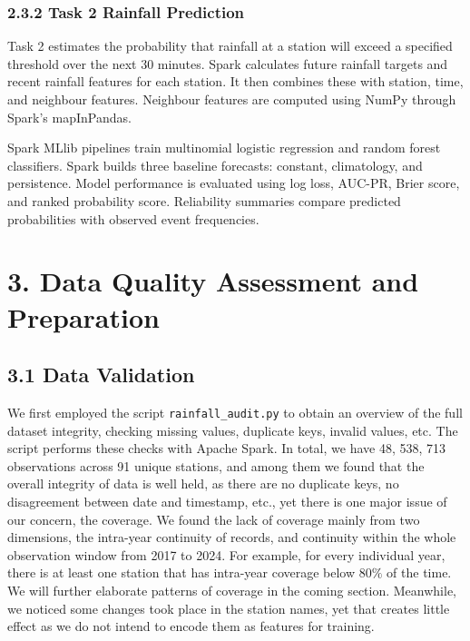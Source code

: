 \documentclass[11pt,a4paper]{article}
\begin{document}
\subsubsection*{2.3.2 Task 2 Rainfall Prediction}
{}


Task 2 estimates the probability that rainfall at a station will exceed a specified threshold over the next 30 minutes. Spark calculates future rainfall targets and recent rainfall features for each station. It then combines these with station, time, and neighbour features. Neighbour features are computed using NumPy through Spark’s mapInPandas.


Spark MLlib pipelines train multinomial logistic regression and random forest classifiers. Spark builds three baseline forecasts: constant, climatology, and persistence. Model performance is evaluated using log loss, AUC-PR, Brier score, and ranked probability score. Reliability summaries compare predicted probabilities with observed event frequencies.


\FloatBarrier

\section*{3. Data Quality Assessment and Preparation}
{}


\subsection*{3.1 Data Validation}
{}


We first employed the script \texttt{rainfall\_audit.py} to obtain an overview of the full dataset integrity, checking missing values, duplicate keys, invalid values, etc. The script performs these checks with Apache Spark. In total, we have 48, 538, 713 observations across 91 unique stations, and among them we found that the overall integrity of data is well held, as there are no duplicate keys, no disagreement between date and timestamp, etc., yet there is one major issue of our concern, the coverage. We found the lack of coverage mainly from two dimensions, the intra-year continuity of records, and continuity within the whole observation window from 2017 to 2024. For example, for every individual year, there is at least one station that has intra-year coverage below \(80\%\) of the time. We will further elaborate patterns of coverage in the coming section. Meanwhile, we noticed some changes took place in the station names, yet that creates little effect as we do not intend to encode them as features for training. 
\end{document}

